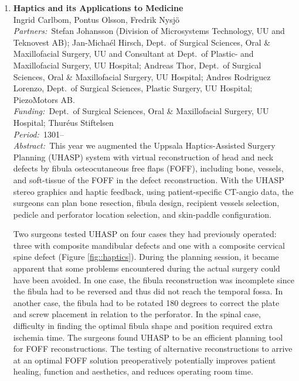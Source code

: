 \documentclass[10pt, a4paper]{article}
\newcommand{\aabstract}[1]{\emph{Abstract:~}#1}
\newcommand{\ffunding}[1]{\emph{Funding:~}#1\\}
\newcommand{\ppartners}[1]{\emph{Partners:~}#1\\}
\newcommand{\pperiod}[1]{\emph{Period:~}#1\\}
\begin{document}
{\begin{enumerate}

\item 
\label{proj:CMS}
\textbf{Haptics and its Applications to Medicine}\\
Ingrid Carlbom, Pontus Olsson, Fredrik Nysj\"{o}\\
\ppartners{Stefan Johansson (Division of Microsystems Technology, UU and Teknovest AB); Jan-Micha{\'e}l Hirsch, Dept.~of Surgical Sciences, Oral \& Maxillofacial Surgery, UU and Consultant at Dept.~of Plastic- and Maxillofacial Surgery, UU Hospital; Andreas Thor, Dept.~of Surgical Sciences, Oral \& Maxillofacial Surgery, UU Hospital; Andres Rodriguez Lorenzo, Dept.~of Surgical Sciences, Plastic Surgery, UU Hospital; PiezoMotors AB.}
\ffunding{Dept.~of Surgical Sciences, Oral \& Maxillofacial Surgery, UU Hospital; Thur\' eus Stiftelsen}
\pperiod{1301--}
\aabstract{This year we augmented the Uppsala Haptics-Assisted Surgery Planning (UHASP) system with virtual reconstruction of head and neck defects by fibula osteocutaneous free flaps (FOFF), including bone, vessels, and soft-tissue of the FOFF in the defect reconstruction. With the UHASP stereo graphics and haptic feedback, using patient-specific CT-angio data, the surgeons can plan bone resection, fibula design, recipient vessels selection, pedicle and perforator location selection, and skin-paddle configuration.

Two surgeons tested UHASP on four cases they had previously operated: three with composite mandibular defects and one with a composite cervical spine defect (Figure \ref{fig::haptics}). During the planning session, it became apparent that some problems encountered during the actual surgery could have been avoided. In one case, the fibula reconstruction was incomplete since the fibula had to be reversed and thus did not reach the temporal fossa. In another case, the fibula had to be rotated 180 degrees to correct the plate and screw placement in relation to the perforator. In the spinal case, difficulty in finding the optimal fibula shape and position required extra ischemia time. The surgeons found UHASP to be an efficient planning tool for FOFF reconstructions. The testing of alternative reconstructions to arrive at an optimal FOFF solution preoperatively potentially improves patient healing, function and aesthetics, and reduces operating room time.}


\end{enumerate}}
\end{document}
